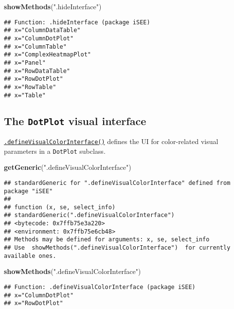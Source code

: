 \documentclass[
]{book}
\newenvironment{Shaded}{\begin{snugshade}}{\end{snugshade}}
\newcommand{\KeywordTok}[1]{\textcolor[rgb]{0.13,0.29,0.53}{\textbf{#1}}}
\newcommand{\NormalTok}[1]{#1}
\newcommand{\StringTok}[1]{\textcolor[rgb]{0.31,0.60,0.02}{#1}}
\begin{document}
\begin{Shaded}
\begin{Highlighting}[]
\KeywordTok{showMethods}\NormalTok{(}\StringTok{".hideInterface"}\NormalTok{)}
\end{Highlighting}
\end{Shaded}

\begin{verbatim}
## Function: .hideInterface (package iSEE)
## x="ColumnDataTable"
## x="ColumnDotPlot"
## x="ColumnTable"
## x="ComplexHeatmapPlot"
## x="Panel"
## x="RowDataTable"
## x="RowDotPlot"
## x="RowTable"
## x="Table"
\end{verbatim}

\hypertarget{the-dotplot-visual-interface}{%
\subsection{\texorpdfstring{The \texttt{DotPlot} visual interface}{The DotPlot visual interface}}\label{the-dotplot-visual-interface}}

\href{https://isee.github.io/iSEE/reference/visual-parameters-generics.html}{\texttt{.defineVisualColorInterface()}} defines the UI for color-related visual parameters in a \texttt{DotPlot} subclass.

\begin{Shaded}
\begin{Highlighting}[]
\KeywordTok{getGeneric}\NormalTok{(}\StringTok{".defineVisualColorInterface"}\NormalTok{)}
\end{Highlighting}
\end{Shaded}

\begin{verbatim}
## standardGeneric for ".defineVisualColorInterface" defined from package "iSEE"
## 
## function (x, se, select_info) 
## standardGeneric(".defineVisualColorInterface")
## <bytecode: 0x7ffb75e3a220>
## <environment: 0x7ffb75e6cb48>
## Methods may be defined for arguments: x, se, select_info
## Use  showMethods(".defineVisualColorInterface")  for currently available ones.
\end{verbatim}

\begin{Shaded}
\begin{Highlighting}[]
\KeywordTok{showMethods}\NormalTok{(}\StringTok{".defineVisualColorInterface"}\NormalTok{)}
\end{Highlighting}
\end{Shaded}

\begin{verbatim}
## Function: .defineVisualColorInterface (package iSEE)
## x="ColumnDotPlot"
## x="RowDotPlot"
\end{verbatim}
\end{document}
